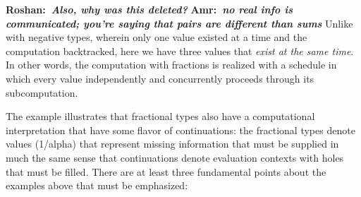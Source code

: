 \documentclass[preprint]{sigplanconf}
\newcommand{\xcomment}[2]{\textbf{#1:~\textsl{#2}}}
\newcommand{\amr}[1]{\xcomment{Amr}{#1}}
\newcommand{\roshan}[1]{\xcomment{Roshan}{#1}}
\begin{document}
\roshan{Also, why was this deleted?}
\amr{no real info is communicated; you're saying that pairs are different 
than sums}
Unlike with negative types, wherein only one value existed at a time and the
computation backtracked, here we have three values that \emph{exist at the
  same time}. In other words, the computation with fractions is realized with
a schedule in which every value independently and concurrently proceeds
through its subcomputation.


The example illustrates that fractional types also have a computational
interpretation that have some flavor of continuations: the fractional types
denote values ({{1/alpha}}) that represent missing information that must be
supplied in much the same sense that continuations denote evaluation contexts
with holes that must be filled.  There are at least three fundamental points
about the examples above that must be emphasized:
\end{document}

